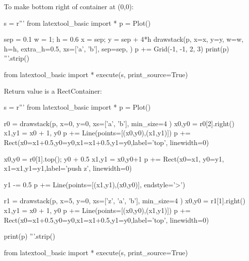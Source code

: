 \newpage
To make bottom right of container at (0,0):

\begin{python}
s = r'''
from latextool_basic import *
p = Plot()

sep = 0.1
w = 1; h = 0.6
x = sep; y = sep + 4*h
drawstack(p,
  x=x, y=y, w=w, h=h, extra_h=0.5, 
  xs=['a', 'b'],
  sep=sep,
  )
p += Grid(-1, -1, 2, 3)
print(p)
'''.strip()

from latextool_basic import *
execute(s, print_source=True)
\end{python}

\newpage

Return value is a RectContainer:

\begin{python}
s = r'''
from latextool_basic import *
p = Plot()

r0 = drawstack(p,
     x=0, y=0,
     xs=['a', 'b'],
     min_size=4
     )
x0,y0 = r0[2].right()
x1,y1 = x0 + 1, y0
p += Line(points=[(x0,y0),(x1,y1)])
p += Rect(x0=x1+0.5,y0=y0,x1=x1+0.5,y1=y0,label='top', linewidth=0)

x0,y0 = r0[1].top(); y0 + 0.5
x1,y1 = x0,y0+1
p += Rect(x0=x1, y0=y1, x1=x1,y1=y1,label='push z', linewidth=0)

y1 -= 0.5
p += Line(points=[(x1,y1),(x0,y0)], endstyle='>')

r1 = drawstack(p,
     x=5, y=0,
     xs=['z', 'a', 'b'],
     min_size=4
     )
x0,y0 = r1[1].right()
x1,y1 = x0 + 1, y0
p += Line(points=[(x0,y0),(x1,y1)])
p += Rect(x0=x1+0.5,y0=y0,x1=x1+0.5,y1=y0,label='top', linewidth=0)

print(p)
'''.strip()

from latextool_basic import *
execute(s, print_source=True)
\end{python}


